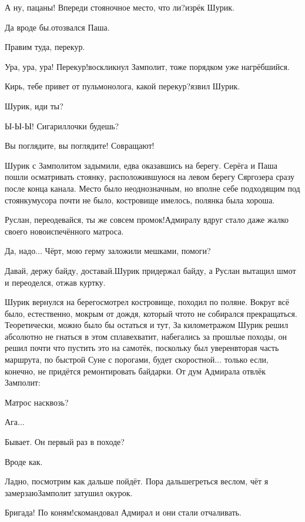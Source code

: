 \diagdash А ну, пацаны! Впереди стояночное место, что ли?\mdash изрёк Шурик.

\diagdash Да вроде бы.\mdash отозвался Паша.

\diagdash Правим туда, перекур. 

\diagdash Ура, ура, ура! Перекур!\mdash воскликнул Замполит, тоже порядком уже нагрёбшийся.

\diagdash Кирь, тебе привет от пульмонолога, какой перекур?\mdash язвил Шурик.

\diagdash Шурик, иди ты?

\diagdash Ы-Ы-Ы! Сигариллочки будешь?

\diagdash Вы поглядите, вы поглядите! Совращают!

Шурик с Замполитом задымили, едва оказавшись на берегу. Серёга и Паша пошли осматривать стоянку, расположившуюся на левом берегу Сяргозера сразу после конца канала. Место было неоднозначным, но вполне себе подходящим под стоянку\mdash мусора почти не было, костровище имелось, полянка была хороша. 

\diagdash Руслан, переодевайся, ты же совсем промок!\mdash Адмиралу вдруг стало даже жалко своего новоиспечённого матроса. 

\diagdash Да, надо$\ldots$ Чёрт, мою герму заложили мешками, помоги?

\diagdash Давай, держу байду, доставай.\mdash Шурик придержал байду, а Руслан вытащил шмот и переоделся, отжав куртку. 

Шурик вернулся на берег\mdash осмотрел костровище, походил по поляне. Вокруг всё было, естественно, мокрым от дождя, который что\sdash то не собирался прекращаться. Теоретически, можно было бы остаться и тут, За километражом Шурик решил абсолютно не гнаться в этом сплаве\mdash хватит, набегались за прошлые походы, он решил почти что пустить это на самотёк, поскольку был уверен\mdash вторая часть маршрута, по быстрой Суне с порогами, будет скоростной$\ldots$ только если, конечно, не придётся ремонтировать байдарки. От дум Адмирала отвлёк Замполит:

\diagdash Матрос насквозь?

\diagdash Ага$\ldots$

\diagdash Бывает. Он первый раз в походе?

\diagdash Вроде как.

\diagdash Ладно, посмотрим как дальше пойдёт. Пора дальше\mdash греться веслом, чёт я замерзаю\mdash Замполит затушил окурок.

\diagdash Бригада! По коням!\mdash скомандовал Адмирал и они стали отчаливать.

